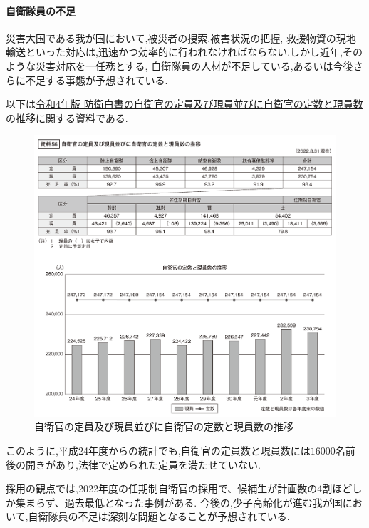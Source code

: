 \documentclass{article}[jsarticle]
\begin{document}
\paragraph{自衛隊員の不足} \par 
災害大国である我が国において,被災者の捜索,被害状況の把握,
救援物資の現地輸送といった対応は,迅速かつ効率的に行われなければならない.しかし近年,そのような災害対応を一任務とする,
自衛隊員の人材が不足している,あるいは今後さらに不足する事態が予想されている.\par 
以下は\href{http://www.clearing.mod.go.jp/hakusho_data/2022/html/ns056000.html}{令和4年版 防衛白書\cite{doc02}の自衛官の定員及び現員並びに自衛官の定数と現員数の推移に関する資料}である.
\begin{figure}[H]
    \centering
    \includegraphics[scale=0.3]{./Images/20240203195052.png}
    \caption{自衛官の定員及び現員並びに自衛官の定数と現員数の推移}
\end{figure}
このように,平成24年度からの統計でも,自衛官の定員数と現員数には$16000$名前後の開きがあり,法律で定められた定員を満たせていない.\par
採用の観点では,2022年度の任期制自衛官の採用で、候補生が計画数の4割ほどしか集まらず、過去最低となった事例がある\cite{news01}.
今後の,少子高齢化が進む我が国において,自衛隊員の不足は深刻な問題となることが予想されている.
\end{document}
